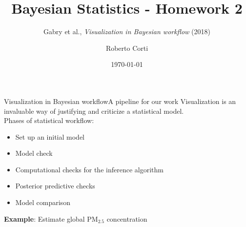 \documentclass{beamer}
\title{Bayesian Statistics - Homework 2}
\subtitle{Gabry et al., \textit{Visualization in Bayesian workflow} (2018)}
\author{Roberto Corti}
\date{\today}
\begin{document}
	
	\frame{\titlepage}
	
	\begin{frame}{Visualization in Bayesian workflow}{A pipeline for our work}
		Visualization is an invaluable way of justifying and criticize a statistical model.\\
		\vspace{0.5cm}
		Phases of statistical workflow:
		\begin{itemize}
			\item Set up an initial model
			\item Model check
			\item Computational checks for the inference algorithm 
			\item Posterior predictive checks
			\item Model comparison
		\end{itemize} 
	\vspace{0.5cm}
	
	\textbf{Example}: Estimate global $\text{PM}_{2.5}$ concentration
	\end{frame}
	
\end{document}
